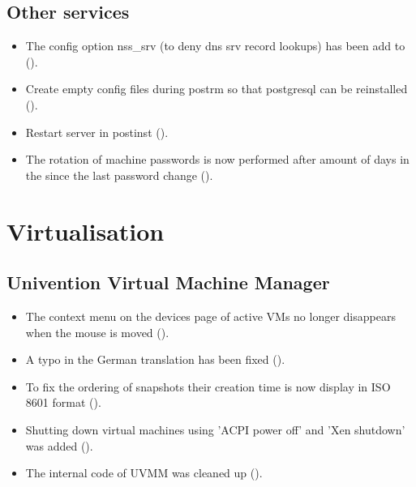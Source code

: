 \subsection{Other services}
\begin{itemize}

\item The config option nss\_srv (to deny dns srv record lookups) has
been add to  ().

\item Create empty  config files during postrm so that
postgresql can be reinstalled ().

\item Restart  server in postinst ().

\item The rotation of machine passwords is now performed after amount of days
in the  since the last password change
().

\end{itemize}


\section{Virtualisation}


\subsection{Univention Virtual Machine Manager}
\begin{itemize}
\item The context menu on the devices page of active VMs no longer disappears when the mouse is moved ().
\item A typo in the German translation has been fixed ().
\item To fix the ordering of snapshots their creation time is now display in ISO 8601 format ().
\item Shutting down virtual machines using 'ACPI power off' and 'Xen shutdown' was added ().
\item The internal code of UVMM was cleaned up ().
\end{itemize}

